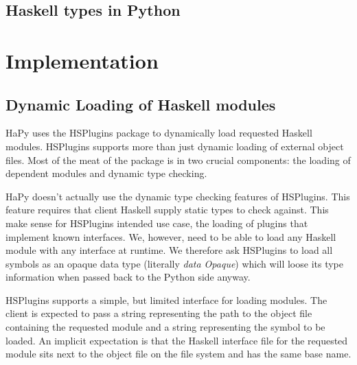 \documentclass[11pt, letterpaper, oneside, twocolumn] {article}
\begin{document}
\subsection{Haskell types in Python}

\section{Implementation}


\subsection{Dynamic Loading of Haskell modules}

HaPy uses the HSPlugins package to dynamically load requested Haskell modules. HSPlugins supports more than just dynamic loading of external object files. Most of the meat of the package is in two crucial components: the loading of dependent modules and dynamic type checking.

HaPy doesn't actually use the dynamic type checking features of HSPlugins. This feature requires that client Haskell supply static types to check against. This make sense for HSPlugins intended use case, the loading of plugins that implement known interfaces. We, however, need to be able to load any Haskell module with any interface at runtime. We therefore ask HSPlugins to load all symbols as an opaque data type (literally \emph{data Opaque}) which will loose its type information when passed back to the Python side anyway.

HSPlugins supports a simple, but limited interface for loading modules. The client is expected to pass a string representing the path to the object file containing the requested module and a string representing the symbol to be loaded. An implicit expectation is that the Haskell interface file for the requested module sits next to the object file on the file system and has the same base name.
\end{document}
